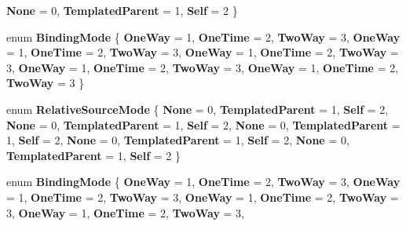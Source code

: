 \begin{DoxyCompactItemize}
{\bfseries None} = 0, 
{\bfseries Templated\+Parent} = 1, 
{\bfseries Self} = 2
 \}
\item 
\mbox{\label{namespace_windows_1_1_u_i_1_1_xaml_1_1_data_ae354a03d8fd12bbb128f8758633b2bd8}} 
enum {\bfseries Binding\+Mode} \{ \newline
{\bfseries One\+Way} = 1, 
{\bfseries One\+Time} = 2, 
{\bfseries Two\+Way} = 3, 
{\bfseries One\+Way} = 1, 
\newline
{\bfseries One\+Time} = 2, 
{\bfseries Two\+Way} = 3, 
{\bfseries One\+Way} = 1, 
{\bfseries One\+Time} = 2, 
\newline
{\bfseries Two\+Way} = 3, 
{\bfseries One\+Way} = 1, 
{\bfseries One\+Time} = 2, 
{\bfseries Two\+Way} = 3, 
\newline
{\bfseries One\+Way} = 1, 
{\bfseries One\+Time} = 2, 
{\bfseries Two\+Way} = 3
 \}
\item 
\mbox{\label{namespace_windows_1_1_u_i_1_1_xaml_1_1_data_a5e4ee6dff370c4af738541df52d97b7f}} 
enum {\bfseries Relative\+Source\+Mode} \{ \newline
{\bfseries None} = 0, 
{\bfseries Templated\+Parent} = 1, 
{\bfseries Self} = 2, 
{\bfseries None} = 0, 
\newline
{\bfseries Templated\+Parent} = 1, 
{\bfseries Self} = 2, 
{\bfseries None} = 0, 
{\bfseries Templated\+Parent} = 1, 
\newline
{\bfseries Self} = 2, 
{\bfseries None} = 0, 
{\bfseries Templated\+Parent} = 1, 
{\bfseries Self} = 2, 
\newline
{\bfseries None} = 0, 
{\bfseries Templated\+Parent} = 1, 
{\bfseries Self} = 2
 \}
\item 
\mbox{\label{namespace_windows_1_1_u_i_1_1_xaml_1_1_data_ae354a03d8fd12bbb128f8758633b2bd8}} 
enum {\bfseries Binding\+Mode} \{ \newline
{\bfseries One\+Way} = 1, 
{\bfseries One\+Time} = 2, 
{\bfseries Two\+Way} = 3, 
{\bfseries One\+Way} = 1, 
\newline
{\bfseries One\+Time} = 2, 
{\bfseries Two\+Way} = 3, 
{\bfseries One\+Way} = 1, 
{\bfseries One\+Time} = 2, 
\newline
{\bfseries Two\+Way} = 3, 
{\bfseries One\+Way} = 1, 
{\bfseries One\+Time} = 2, 
{\bfseries Two\+Way} = 3, 
\newline

\end{DoxyCompactItemize}
